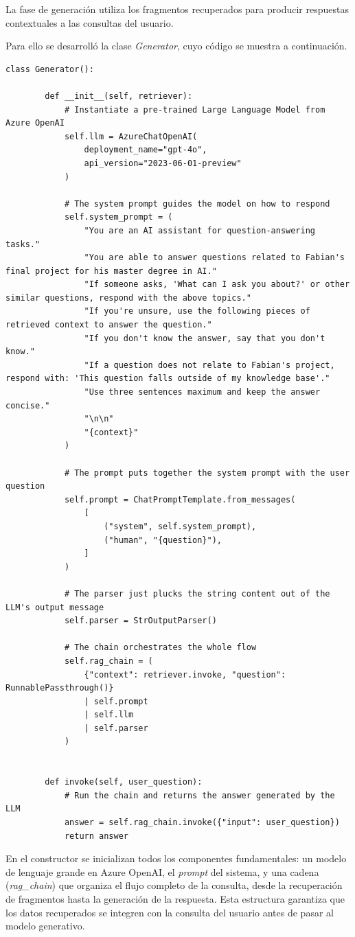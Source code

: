 La fase de generación utiliza los fragmentos recuperados para producir respuestas contextuales a las consultas del usuario.

Para ello se desarrolló la clase \textit{Generator}, cuyo código se muestra a continuación.

\begin{lstlisting}[label=cod:generator,caption=Clase \textit{Generator}.]
	class Generator():

		def __init__(self, retriever):
			# Instantiate a pre-trained Large Language Model from Azure OpenAI
			self.llm = AzureChatOpenAI(
				deployment_name="gpt-4o",
				api_version="2023-06-01-preview"
			)

			# The system prompt guides the model on how to respond
			self.system_prompt = (
				"You are an AI assistant for question-answering tasks."
				"You are able to answer questions related to Fabian's final project for his master degree in AI."
				"If someone asks, 'What can I ask you about?' or other similar questions, respond with the above topics."
				"If you're unsure, use the following pieces of retrieved context to answer the question." 
				"If you don't know the answer, say that you don't know."
				"If a question does not relate to Fabian's project, respond with: 'This question falls outside of my knowledge base'." 
				"Use three sentences maximum and keep the answer concise."
				"\n\n"
				"{context}"
			)

			# The prompt puts together the system prompt with the user question
			self.prompt = ChatPromptTemplate.from_messages(
				[
					("system", self.system_prompt),
					("human", "{question}"),
				]
			)

			# The parser just plucks the string content out of the LLM's output message
			self.parser = StrOutputParser()

			# The chain orchestrates the whole flow
			self.rag_chain = (
				{"context": retriever.invoke, "question": RunnablePassthrough()}
				| self.prompt
				| self.llm
				| self.parser
			)


		def invoke(self, user_question):
			# Run the chain and returns the answer generated by the LLM
			answer = self.rag_chain.invoke({"input": user_question})
			return answer
\end{lstlisting}

En el constructor se inicializan todos los componentes fundamentales: un modelo de lenguaje grande en Azure OpenAI,
el \textit{prompt} del sistema, y una cadena (\textit{rag\_chain}) que organiza el flujo completo de la consulta, 
desde la recuperación de fragmentos hasta la generación de la respuesta. Esta estructura 
garantiza que los datos recuperados se integren con la consulta del usuario antes de pasar al modelo generativo.

